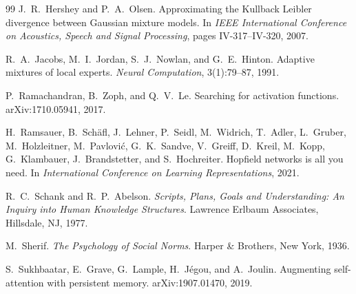 \documentclass[11pt]{article}
\theoremstyle{definition}
\theoremstyle{remark}
\begin{document}
\begin{thebibliography}{99}
J.~R.~Hershey and P.~A.~Olsen.
\newblock Approximating the {K}ullback {L}eibler divergence between {G}aussian mixture models.
\newblock In \emph{IEEE International Conference on Acoustics, Speech and Signal Processing}, pages IV-317--IV-320, 2007.

R.~A.~Jacobs, M.~I.~Jordan, S.~J.~Nowlan, and G.~E.~Hinton.
\newblock Adaptive mixtures of local experts.
\newblock \emph{Neural Computation}, 3(1):79--87, 1991.

P.~Ramachandran, B.~Zoph, and Q.~V.~Le.
\newblock Searching for activation functions.
\newblock arXiv:1710.05941, 2017.

H.~Ramsauer, B.~Sch{\"a}fl, J.~Lehner, P.~Seidl, M.~Widrich, T.~Adler, L.~Gruber, M.~Holzleitner, M.~Pavlovi{\'c}, G.~K.~Sandve, V.~Greiff, D.~Kreil, M.~Kopp, G.~Klambauer, J.~Brandstetter, and S.~Hochreiter.
\newblock Hopfield networks is all you need.
\newblock In \emph{International Conference on Learning Representations}, 2021.

R.~C.~Schank and R.~P.~Abelson.
\newblock \emph{Scripts, Plans, Goals and Understanding: An Inquiry into Human Knowledge Structures}.
\newblock Lawrence Erlbaum Associates, Hillsdale, NJ, 1977.

M.~Sherif.
\newblock \emph{The Psychology of Social Norms}.
\newblock Harper \& Brothers, New York, 1936.

S.~Sukhbaatar, E.~Grave, G.~Lample, H.~J{\'e}gou, and A.~Joulin.
\newblock Augmenting self-attention with persistent memory.
\newblock arXiv:1907.01470, 2019.

\end{thebibliography}
\end{document}
